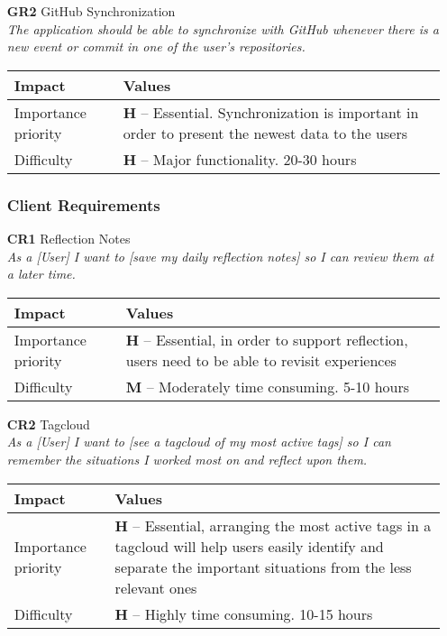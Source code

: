 \begin{itemize}
    \item[\textbf{GR2}] GitHub Synchronization\\
        \textit{\small{The application should be able to synchronize with GitHub whenever there is a new event or commit in one of the user's repositories.}}

        \begin{tabular}{| l | p{7cm} |}
            \hline
            \rowcolor[gray]{0.8}
            \textbf{Impact} & \textbf{Values} \\
            \hline
            Importance priority & \textbf{H} -- Essential. Synchronization is important in order to present the newest data to the users\\
            Difficulty & \textbf{H} -- Major functionality. 20-30 hours\\
            \hline
        \end{tabular}
    \vspace{0.5cm}

    \subsubsection{Client Requirements}
    \item[\textbf{CR1}] Reflection Notes\\
        \textit{\small{As a [User] I want to [save my daily reflection notes] so I can review them at a later time.}}

        \begin{tabular}{| l | p{8cm} |}
            \hline
            \rowcolor[gray]{0.8}
            \textbf{Impact} & \textbf{Values} \\
            \hline
            Importance priority & \textbf{H} -- Essential, in order to support reflection, users need to be able to revisit experiences\\
            Difficulty & \textbf{M} -- Moderately time consuming. 5-10 hours\\
            \hline
        \end{tabular}
    \vspace{0.5cm}

    \item[\textbf{CR2}] Tagcloud\\
        \textit{\small{As a [User] I want to [see a tagcloud of my most active tags] so I can remember the situations I worked most on and reflect upon them.}}

        \begin{tabular}{| l | p{8cm} |}
            \hline
            \rowcolor[gray]{0.8}
            \textbf{Impact} & \textbf{Values} \\
            \hline
            Importance priority & \textbf{H} -- Essential, arranging the most active tags in a tagcloud will help users easily identify and separate the important situations from the less relevant ones\\
            Difficulty & \textbf{H} -- Highly time consuming. 10-15 hours\\
            \hline
        \end{tabular}
    \vspace{0.5cm}


\end{itemize}
